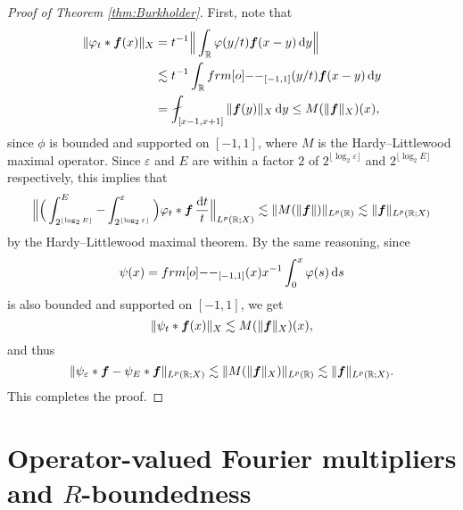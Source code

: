 \begin{proof}[Proof of Theorem \ref{thm:Burkholder}]
First, note that
\begin{equation*}
  \begin{aligned}
    \|\phi_{t} \ast \mb{f}(x)\|_{X} &= t^{-1} \Big\| \int_{\R} \phi(y/t) \mb{f}(x-y) \, \dd y \Big\| \\
    &\lesssim t^{-1} \int_{\R} \1_{[-1,1]}(y/t) \mb{f}(x-y) \, \dd y \\
    &= \fint_{[x-1, x+1]} \|\mb{f}(y)\|_{X} \, \dd y \leq M(\|\mb{f}\|_{X})(x),
  \end{aligned}
\end{equation*}
since $\phi$ is bounded and supported on $[-1,1]$, where $M$ is the Hardy--Littlewood maximal operator.
Since $\varepsilon$ and $E$ are within a factor $2$ of $2^{\lfloor \log_{2} \varepsilon \rfloor}$ and $2^{\lfloor \log_{2} E \rfloor}$ respectively, this implies that
\begin{equation*}
  \Big\| \Big( \int_{2^{\lfloor \log_{2} E \rfloor}}^{E} - \int_{2^{\lfloor \log_{2} \varepsilon \rfloor}}^{\varepsilon} \Big) \varphi_{t} \ast \bm{f} \, \frac{\mathrm{d} t}{t} \Big\|_{L^p(\mathbb{R};X)}
  \lesssim \|M(\|\bm{f}\|)\|_{L^p(\mathbb{R})} \lesssim \|\bm{f}\|_{L^p(\mathbb{R};X)}
\end{equation*}
by the Hardy--Littlewood maximal theorem.
By the same reasoning, since
\begin{equation*}
  \psi(x) = \1_{[-1,1]}(x) x^{-1} \int_{0}^{x} \phi(s) \, \dd s
\end{equation*}
is also bounded and supported on $[-1,1]$, we get
\begin{equation*}
  \|\psi_{t} \ast \bm{f}(x)\|_{X} \lesssim M(\|\bm{f}\|_{X})(x),
\end{equation*}
and thus
\begin{equation*}
  \|\psi_{\varepsilon} \ast \bm{f} - \psi_{E} \ast \bm{f}\|_{L^p(\mathbb{R};X)} \lesssim \|M(\|\bm{f}\|_{X})\|_{L^p(\mathbb{R})} \lesssim \|\bm{f}\|_{L^p(\mathbb{R};X)}.
\end{equation*}
This completes the proof.
\end{proof}

\section{Operator-valued Fourier multipliers and $R$-boundedness}

